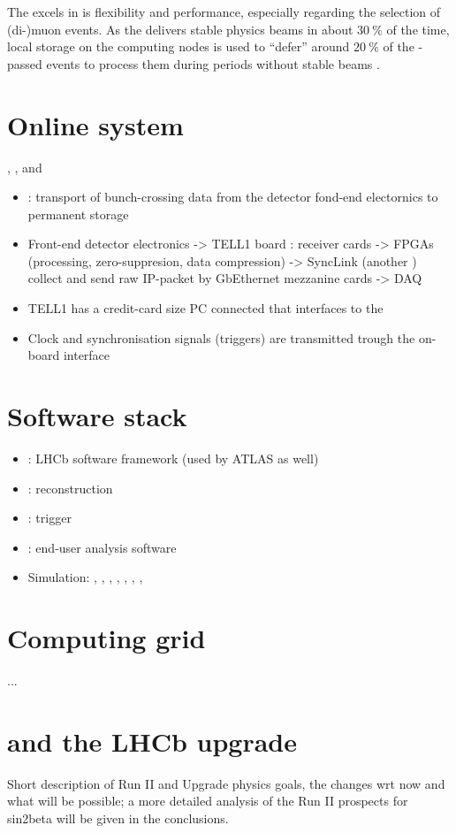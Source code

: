 The \HLT excels in is flexibility and performance, especially regarding the
selection of (di-)muon events. As the \LHC delivers stable physics beams in
about $\SI{30}{\percent}$ of the time, local storage on the computing nodes is
used to \enquote{defer} around $\SI{20}{\percent}$ of the \LZero-passed events
to process them during periods without stable beams \cite{Frank:2014ixa}.


\section{Online system}
\DAQ, \TFC, and \ECS
\begin{itemize}
  \item \DAQ: transport of bunch-crossing data from the detector fond-end electornics to permanent storage
  \item Front-end detector electronics -> TELL1 board : receiver cards -> \acp{FPGA} (processing, zero-suppresion, data compression) -> SyncLink (another \FPGA) collect and send raw IP-packet by GbEthernet mezzanine cards -> DAQ
  \item TELL1 has a credit-card size PC connected that interfaces to the \ECS
  \item Clock and synchronisation signals (\eg triggers) are transmitted trough the on-board \TTC interface
\end{itemize}

\section{Software stack}
\begin{itemize}
  \item \Gaudi: LHCb software framework (used by ATLAS as well)
  \item \Brunel: reconstruction
  \item \Moore: trigger
  \item \DaVinci: end-user analysis software
  \item Simulation: \Gauss, \Boole, \Pythia, \EvtGen, \Photos, \Herwigpp, \Sherpa, \GeantFour
\end{itemize}

\section{Computing grid}
...

\section{\RunTwo and the \acs*{LHCb} upgrade}
Short description of Run II and Upgrade physics goals, the changes wrt now and what will be possible; a more detailed analysis of the Run II prospects for sin2beta will be given in the conclusions.
